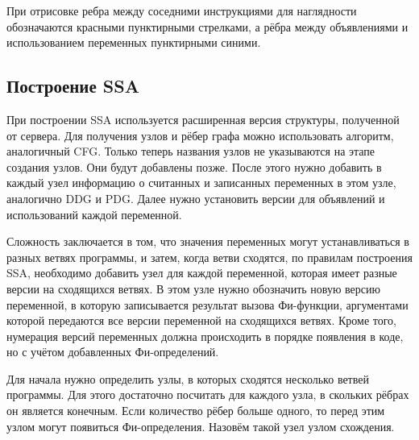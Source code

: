 При отрисовке ребра между соседними инструкциями для наглядности обозначаются красными пунктирными стрелками, а рёбра между объявлениями и использованием переменных пунктирными синими.

\subsection{Построение SSA} \label{ch2:subsec-title-abbr}

При построении SSA используется расширенная версия структуры, полученной от сервера. Для получения узлов и рёбер графа можно использовать алгоритм, аналогичный CFG. Только теперь названия узлов не указываются на этапе создания узлов. Они будут добавлены позже. После этого нужно добавить в каждый узел информацию о считанных и записанных переменных в этом узле, аналогично DDG и PDG. Далее нужно установить версии для объявлений и использований каждой переменной.

Сложность заключается в том, что значения переменных могут устанавливаться в разных ветвях программы, и затем, когда ветви сходятся, по правилам построения SSA, необходимо добавить узел для каждой переменной, которая имеет разные версии на сходящихся ветвях. В этом узле нужно обозначить новую версию переменной, в которую записывается результат вызова Фи-функции, аргументами которой передаются все версии переменной на сходящихся ветвях. Кроме того, нумерация версий переменных должна происходить в порядке появления в коде, но с учётом добавленных Фи-определений.

Для начала нужно определить узлы, в которых сходятся несколько ветвей программы. Для этого достаточно посчитать для каждого узла, в скольких рёбрах он является конечным. Если количество рёбер больше одного, то перед этим узлом могут появиться Фи-определения. Назовём такой узел узлом схождения.

